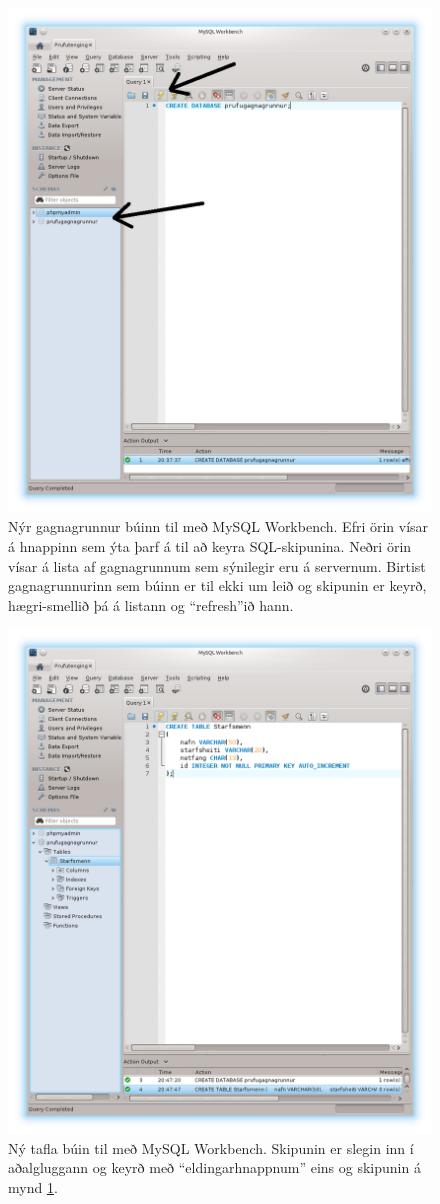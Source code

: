 \begin{figure}
\caption[Nýr gagnagrunnur]{Nýr gagnagrunnur búinn til með MySQL Workbench. Efri örin vísar á hnappinn sem ýta þarf á til að keyra SQL-skipunina. Neðri örin vísar á lista af gagnagrunnum sem sýnilegir eru á servernum. Birtist gagnagrunnurinn sem búinn er til ekki um leið og skipunin er keyrð, hægri-smellið þá á listann og ``refresh''ið hann.}
\label{mynd:workbench-create-db}
\centering
\includegraphics[width=0.8\linewidth]{myndir/workbench-create-db-or}
\end{figure}

\begin{figure}
\caption[Ný tafla]{Ný tafla búin til með MySQL Workbench. Skipunin er slegin inn í aðalgluggann og keyrð með ``eldingarhnappnum'' eins og skipunin á mynd \ref{mynd:workbench-create-db}.}
\label{mynd:workbench-create-table}
\centering
\includegraphics[width=0.8\linewidth]{myndir/workbench-create-table}
\end{figure}

